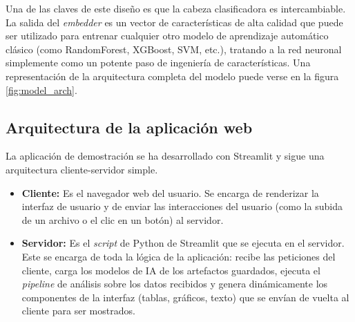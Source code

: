 Una de las claves de este diseño es que la cabeza clasificadora es intercambiable. La salida del \textit{embedder} es un vector de características de alta calidad que puede ser utilizado para entrenar cualquier otro modelo de aprendizaje automático clásico (como RandomForest, XGBoost, SVM, etc.), tratando a la red neuronal simplemente como un potente paso de ingeniería de características. Una representación de la arquitectura completa del modelo puede verse en la figura \ref{fig:model_arch}.


\subsection{Arquitectura de la aplicación web}

La aplicación de demostración se ha desarrollado con Streamlit y sigue una arquitectura cliente-servidor simple.

\begin{itemize}
	\item \textbf{Cliente:} Es el navegador web del usuario. Se encarga de renderizar la interfaz de usuario y de enviar las interacciones del usuario (como la subida de un archivo o el clic en un botón) al servidor.
	
	\item \textbf{Servidor:} Es el \textit{script} de Python de Streamlit que se ejecuta en el servidor. Este se encarga de toda la lógica de la aplicación: recibe las peticiones del cliente, carga los modelos de IA de los artefactos guardados, ejecuta el \textit{pipeline} de análisis sobre los datos recibidos y genera dinámicamente los componentes de la interfaz (tablas, gráficos, texto) que se envían de vuelta al cliente para ser mostrados.
\end{itemize}
